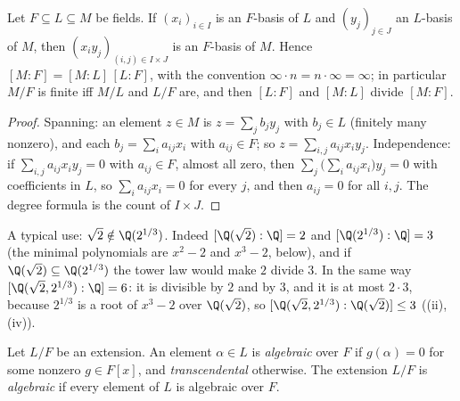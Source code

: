 \begin{proposition}\label{prop:galois:tower}
Let $F\subseteq L\subseteq M$ be fields. If $(x_i)_{i\in I}$ is an $F$-basis of $L$ and $(y_j)_{j\in J}$ an $L$-basis of $M$, then $(x_iy_j)_{(i,j)\in I\times J}$
is an $F$-basis of $M$. Hence $[M:F]=[M:L]\,[L:F]$, with the convention $\infty\cdot n=n\cdot\infty=\infty$; in particular $M/F$ is finite iff $M/L$ and
$L/F$ are, and then $[L:F]$ and $[M:L]$ divide $[M:F]$.
\end{proposition}

\begin{proof}
Spanning: an element $z\in M$ is $z=\sum_jb_jy_j$ with $b_j\in L$ (finitely many nonzero), and each $b_j=\sum_ia_{ij}x_i$ with $a_{ij}\in F$; so
$z=\sum_{i,j}a_{ij}x_iy_j$. Independence: if $\sum_{i,j}a_{ij}x_iy_j=0$ with $a_{ij}\in F$, almost all zero, then $\sum_j\bigl(\sum_ia_{ij}x_i\bigr)y_j=0$ with
coefficients in $L$, so $\sum_ia_{ij}x_i=0$ for every $j$, and then $a_{ij}=0$ for all $i,j$. The degree formula is the count of $I\times J$.
\end{proof}

A typical use: $\sqrt2\notin\Q(2^{1/3})$. Indeed $[\Q(\sqrt2):\Q]=2$ and $[\Q(2^{1/3}):\Q]=3$ (the minimal polynomials are $x^2-2$ and $x^3-2$,
 below), and if $\Q(\sqrt2)\subseteq\Q(2^{1/3})$ the tower law would make $2$ divide $3$. In the same way
$[\Q(\sqrt2,2^{1/3}):\Q]=6$: it is divisible by $2$ and by $3$, and it is at most $2\cdot3$, because $2^{1/3}$ is a root of $x^3-2$ over $\Q(\sqrt2)$, so
$[\Q(\sqrt2,2^{1/3}):\Q(\sqrt2)]\le3$ ((ii), (iv)).

\begin{definition}\label{def:galois:algebraic}
Let $L/F$ be an extension. An element $\alpha\in L$ is \emph{algebraic} over $F$ if $g(\alpha)=0$ for some nonzero $g\in F[x]$, and \emph{transcendental}
otherwise. The extension $L/F$ is \emph{algebraic} if every element of $L$ is algebraic over $F$.
\end{definition}

